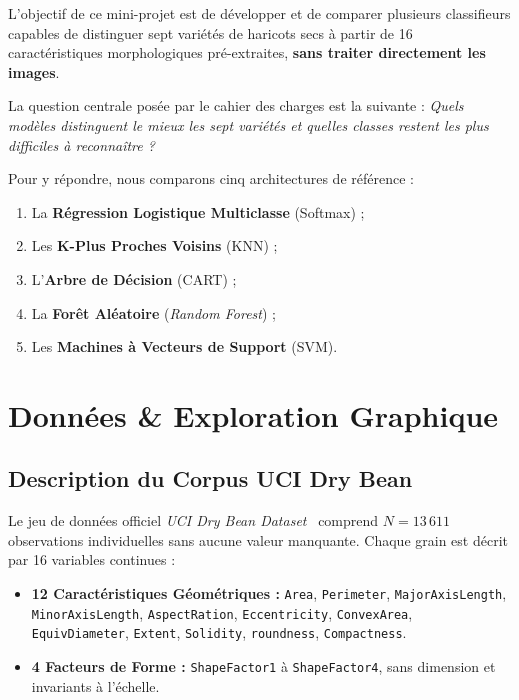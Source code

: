 \documentclass[10pt,a4paper,twocolumn]{article}
\begin{document}
L'objectif de ce mini-projet est de développer et de comparer plusieurs classifieurs capables de distinguer sept variétés de haricots secs à partir de 16 caractéristiques morphologiques pré-extraites, \textbf{sans traiter directement les images}.

La question centrale posée par le cahier des charges est la suivante : \textit{Quels modèles distinguent le mieux les sept variétés et quelles classes restent les plus difficiles à reconnaître ?}

Pour y répondre, nous comparons cinq architectures de référence :
\begin{enumerate}
    \item La \textbf{Régression Logistique Multiclasse} (Softmax) ;
    \item Les \textbf{K-Plus Proches Voisins} (KNN) ;
    \item L'\textbf{Arbre de Décision} (CART) ;
    \item La \textbf{Forêt Aléatoire} (\textit{Random Forest}) ;
    \item Les \textbf{Machines à Vecteurs de Support} (SVM).
\end{enumerate}

\section{Données \& Exploration Graphique}
\label{sec:eda}

\subsection{Description du Corpus UCI Dry Bean}
Le jeu de données officiel \textit{UCI Dry Bean Dataset}~\cite{koklu2020multiclass} comprend $N = 13\,611$ observations individuelles sans aucune valeur manquante. Chaque grain est décrit par 16 variables continues :
\begin{itemize}
    \item \textbf{12 Caractéristiques Géométriques :} \texttt{Area}, \texttt{Perimeter}, \texttt{MajorAxisLength}, \texttt{MinorAxisLength}, \texttt{AspectRation}, \texttt{Eccentricity}, \texttt{ConvexArea}, \texttt{EquivDiameter}, \texttt{Extent}, \texttt{Solidity}, \texttt{roundness}, \texttt{Compactness}.
    \item \textbf{4 Facteurs de Forme :} \texttt{ShapeFactor1} à \texttt{ShapeFactor4}, sans dimension et invariants à l'échelle.
\end{itemize}
\end{document}
